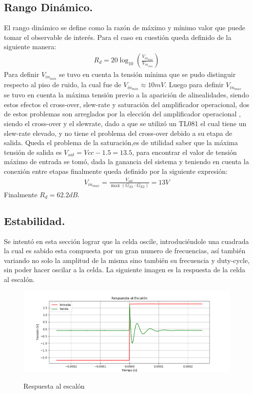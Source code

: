 \subsection{Rango Dinámico.}
El rango dinámico se define como la razón de máximo y mínimo valor que puede tomar el observable de interés. Para el caso en cuestión queda definido de la siguiente manera:
\begin{align}
R_d = 20 \log_{10} \left( \frac{V_{in_{max}}}{V_{in_{min}}} \right)
\end{align}
Para definir $V_{in_{min}}$ se tuvo en cuenta la tensión mínima que se pudo distinguir respecto al piso de ruido, la cual fue de $V_{in_{min}} \approx 10mV$. Luego para definir $V_{in_{max}}$ se tuvo en cuenta la máxima tensión previo a la aparición de alinealidades, siendo estos efectos el cross-over, slew-rate y saturación del amplificador operacional, dos de estos problemas son arreglados por la elección del amplificador operacional , siendo el cross-over y el slewrate, dado a que se utilizó un TL081 el cual tiene un slew-rate elevado, y no tiene el problema del cross-over debido a su etapa de salida. Queda el problema de la saturación,es de utilidad saber que la máxima tensión de salida es $V_{sat} = Vcc-1.5 =13.5$, para encontrar el valor de tensión máximo de entrada se tomó, dada la ganancia del sistema y teniendo en cuenta la conexión entre etapas finalmente queda definido por la siguiente expresión:
\begin{align}
V_{in_{max}}=\frac{V_{sat}}{  \max(G_{E1} \cdot G_{E2} )} = 13V
\end{align}
Finalmente $R_d = 62.2dB$.
\subsection{Estabilidad.}
Se intentó en esta sección lograr que la celda oscile, introduciéndole una cuadrada la cual es sabido esta compuesta por un gran numero de frecuencias, así también variando no solo la amplitud de la misma sino también su frecuencia y duty-cycle, sin poder hacer oscilar a la celda. La siguiente imagen es la respuesta de la celda al escalón.
\begin{figure}[H]
	\centering
	\includegraphics[width=\textwidth]{Imagenes-Ej3/Step.png}
	\label{fig:stepresponse}
	\caption{Respuesta al escalón}
\end{figure}
